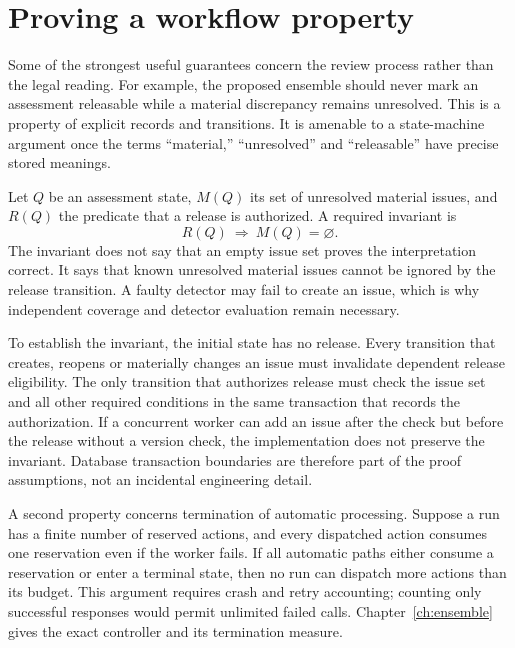 \documentclass[12pt,a4paper,oneside,openany]{book}
\begin{document}
\section{Proving a workflow property}
\label{merge:M03:10}

\label{sec:proof-workflow}
Some of the strongest useful guarantees concern the review process rather than
the legal reading. For example, the proposed ensemble should never mark an
assessment releasable while a material discrepancy remains unresolved. This is
a property of explicit records and transitions. It is amenable to a state-machine
argument once the terms ``material,'' ``unresolved'' and ``releasable'' have
precise stored meanings.

Let $Q$ be an assessment state, $M(Q)$ its set of unresolved material issues,
and $R(Q)$ the predicate that a release is authorized. A required invariant is
\begin{equation}
 R(Q)\ \Longrightarrow\ M(Q)=\varnothing.
 \label{eq:no-open-release}
\end{equation}
The invariant does not say that an empty issue set proves the interpretation
correct. It says that known unresolved material issues cannot be ignored by
the release transition. A faulty detector may fail to create an issue, which
is why independent coverage and detector evaluation remain necessary.

To establish the invariant, the initial state has no release. Every transition
that creates, reopens or materially changes an issue must invalidate dependent
release eligibility. The only transition that authorizes release must check
the issue set and all other required conditions in the same transaction that
records the authorization. If a concurrent worker can add an issue after the
check but before the release without a version check, the implementation does
not preserve the invariant. Database transaction boundaries are therefore part
of the proof assumptions, not an incidental engineering detail.

A second property concerns termination of automatic processing. Suppose a run
has a finite number of reserved actions, and every dispatched action consumes
one reservation even if the worker fails. If all automatic paths either
consume a reservation or enter a terminal state, then no run can dispatch more
actions than its budget. This argument requires crash and retry accounting;
counting only successful responses would permit unlimited failed calls.
Chapter~\ref{ch:ensemble} gives the exact controller and its termination
measure.
\end{document}
